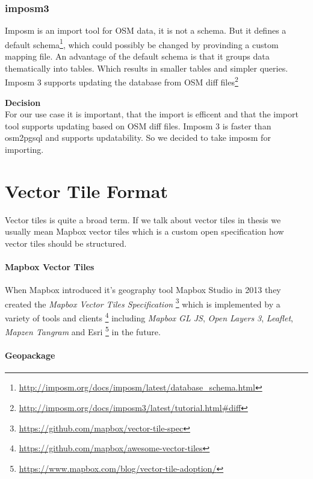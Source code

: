\subsubsection{imposm3}\label{imposm-importer}

Imposm is an import tool for OSM data, it is not a schema. But it
defines a default
schema\footnote{\url{http://imposm.org/docs/imposm/latest/database_schema.html}},
which could possibly be changed by provinding a custom mapping file. An
advantage of the default schema is that it groups data thematically into
tables. Which results in smaller tables and simpler queries. Imposm 3
supports updating the database from OSM diff
files\footnote{\url{http://imposm.org/docs/imposm3/latest/tutorial.html\#diff}}
 
\begin{tcolorbox}
\textbf{Decision} \\
For our use case it is important, that the import is efficent and that
the import tool supports updating based on OSM diff files. Imposm 3 is
faster than osm2pgsql and supports updatability. So we decided to take
imposm for importing.
\end{tcolorbox}

\section{Vector Tile Format}\label{vector-tile-formats}

Vector tiles is quite a broad term. If we talk about vector tiles in thesis we usually mean Mapbox vector tiles which is a custom open specification how vector tiles should be structured.

\paragraph{Mapbox Vector Tiles}

When Mapbox introduced it's geography tool Mapbox Studio in 2013 they
created the \emph{Mapbox Vector Tiles Specification}
\footnote{\url{https://github.com/mapbox/vector-tile-spec}} which is
implemented by a variety of tools and clients
\footnote{\url{https://github.com/mapbox/awesome-vector-tiles}}
including \emph{Mapbox GL JS}, \emph{Open Layers 3}, \emph{Leaflet},
\emph{Mapzen Tangram} and Esri
\footnote{\url{https://www.mapbox.com/blog/vector-tile-adoption/}} in
the future.

\paragraph{Geopackage}

